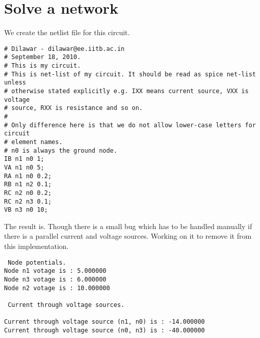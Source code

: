 \documentclass[a4paper,10pt]{article}
\begin{document}
\section{Solve a network}
We create the netlist file for this circuit.
\begin{verbatim}
# Dilawar - dilawar@ee.iitb.ac.in
# September 18, 2010.
# This is my circuit.
# This is net-list of my circuit. It should be read as spice net-list unless
# otherwise stated explicitly e.g. IXX means current source, VXX is voltage
# source, RXX is resistance and so on.
#
# Only difference here is that we do not allow lower-case letters for circuit
# element names.
# n0 is always the ground node.
IB n1 n0 1;
VA n1 n0 5;
RA n1 n0 0.2;
RB n1 n2 0.1;
RC n2 n0 0.2;
RC n2 n3 0.1;
VB n3 n0 10;
\end{verbatim}
The result is. Though there is a small bug which has to be handled manually if
there is a parallel current and voltage sources. Working on it to remove it
from this implementation.
\begin{verbatim}
 Node potentials.
Node n1 votage is : 5.000000
Node n3 votage is : 6.000000
Node n2 votage is : 10.000000

 Current through voltage sources.

Current through voltage source (n1, n0) is : -14.000000
Current through voltage source (n0, n3) is : -40.000000
\end{verbatim}
\end{document}
